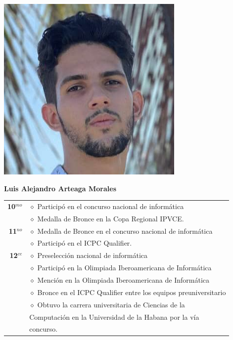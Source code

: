 \begin{minipage}{0.2\textwidth}
	\includegraphics[width=\linewidth]{img/concursantes/alejandro.png} %
\end{minipage}
\hfill
\begin{minipage}{0.7\textwidth}
	\textbf{Luis Alejandro Arteaga Morales}
	
	\vspace*{0.1in}
	\begin{longtable}{rl}
	
		\textbf{10$^{mo}$} & $\diamond$ Participó en el concurso nacional de informática\\
						   & $\diamond$ Medalla de Bronce en la Copa Regional IPVCE.  \\
		\textbf{11$^{no}$} & $\diamond$ Medalla de Bronce en el concurso nacional de informática \\
		                   & $\diamond$ Participó en el ICPC Qualifier.  \\
		\textbf{12$^{ce}$} & $\diamond$ Preselección nacional de informática  \\
		                   & $\diamond$ Participó en la Olimpiada Iberoamericana de Informática  \\
		                   & $\diamond$ Mención en la Olimpiada Iberoamericana de Informática  \\
		                   & $\diamond$ Bronce en el ICPC Qualifier entre los equipos preuniversitario  \\
		                   & $\diamond$ Obtuvo la carrera universitaria de Ciencias de la \\
		                   & Computación en la Universidad de la Habana por la vía \\
		                   & concurso.
		
	\end{longtable}
	
\end{minipage}

